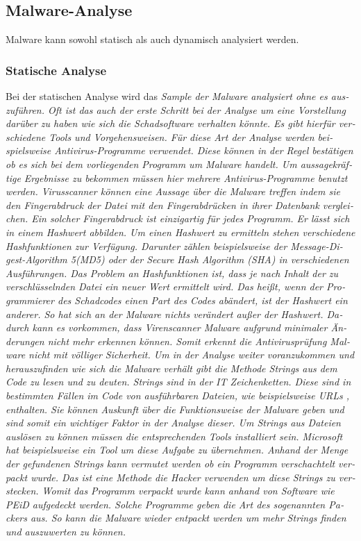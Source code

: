 \begin{otherlanguage}{ngerman}
\subsection{Malware-Analyse}
Malware kann sowohl statisch als auch dynamisch analysiert werden.
\subsubsection{Statische Analyse}
Bei der statischen Analyse wird das \it Sample \rm der Malware analysiert ohne es auszuführen. Oft ist das auch der erste Schritt bei der Analyse um eine Vorstellung darüber zu haben wie sich die Schadsoftware verhalten könnte. Es gibt hierfür verschiedene Tools und Vorgehensweisen. 
\newline 
Für diese Art der Analyse werden beispielsweise Antivirus-Programme verwendet. Diese können in der Regel bestätigen ob es sich bei dem vorliegenden Programm um Malware handelt. Um aussagekräftige Ergebnisse zu bekommen müssen hier mehrere Antivirus-Programme benutzt werden. Virusscanner können eine Aussage über die Malware treffen indem sie den \dq Fingerabdruck \dq{} der Datei mit den Fingerabdrücken in ihrer Datenbank vergleichen. Ein solcher \dq Fingerabdruck\dq{} ist einzigartig für jedes Programm. Er lässt sich in einem Hashwert abbilden. Um einen Hashwert zu ermitteln stehen verschiedene Hashfunktionen zur Verfügung. Darunter zählen beispielsweise der \dq Message-Digest-Algorithm 5\dq (MD5) oder der \dq Secure Hash Algorithm\dq{} (SHA) in verschiedenen Ausführungen. Das Problem an Hashfunktionen ist, dass je nach Inhalt der zu verschlüsselnden Datei ein neuer Wert ermittelt wird. Das heißt, wenn der Programmierer des Schadcodes einen Part des Codes abändert, ist der Hashwert ein anderer. So hat sich an der Malware nichts verändert außer der Hashwert. Dadurch kann es vorkommen, dass Virenscanner Malware aufgrund minimaler Änderungen nicht mehr erkennen können. Somit erkennt die Antivirusprüfung Malware nicht mit völliger Sicherheit. 
\newline
Um in der Analyse weiter voranzukommen und herauszufinden wie sich die Malware verhält gibt die Methode Strings aus dem Code zu lesen und zu deuten. Strings sind in der \it IT \rm Zeichenketten. Diese sind in bestimmten Fällen im Code von ausführbaren Dateien, wie beispielsweise \it URLs \rm, enthalten. Sie können Auskunft über die Funktionsweise der Malware geben und sind somit ein wichtiger Faktor in der Analyse dieser. Um Strings aus Dateien auslösen zu können müssen die entsprechenden Tools installiert sein. Microsoft hat beispielsweise ein Tool um diese Aufgabe zu übernehmen. Anhand der Menge der gefundenen Strings kann vermutet werden ob ein Programm verschachtelt verpackt wurde. Das ist eine Methode die Hacker verwenden um diese Strings zu verstecken. Womit das Programm verpackt wurde kann anhand von Software wie PEiD aufgedeckt werden. Solche Programme geben die Art des sogenannten \dq Packers\dq{} aus. So kann die Malware wieder entpackt werden um mehr Strings finden und auszuwerten zu können.

\end{otherlanguage}
